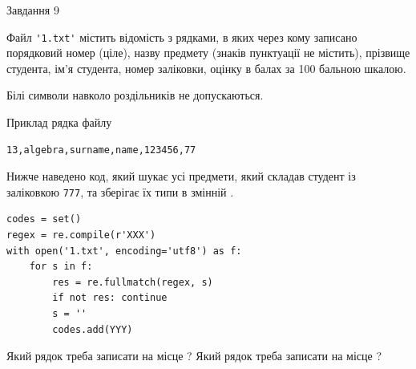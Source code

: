\documentclass[12pt, ukrainian]{article}
\def\code#1{\Verb!#1!}
\begin{document}
{\begin{minipage}[t]{8.0cm}
\end{minipage}

               
{\begin{center}Завдання {9}\end{center}}
\vspace{-4mm}
Файл \code{'1.txt'} містить відомість з рядками, в яких через кому записано поряд\-ковий номер (ціле), назву предмету (знаків пунктуації не містить), прізвище студента, ім'я студента, номер заліковки, оцінку в балах за 100 бальною шкалою.

Білі символи навколо роздільників не допускаються.

Приклад рядка файлу



\begin{verbatim}
13,algebra,surname,name,123456,77
\end{verbatim}


Нижче наведено код, який шукає усі предмети, який складав студент із заліковкою \code{777}, та зберігає їх типи в змінній .



\begin{verbatim}
codes = set()
regex = re.compile(r'XXX')
with open('1.txt', encoding='utf8') as f:
    for s in f:
        res = re.fullmatch(regex, s)
        if not res: continue
        s = ''
        codes.add(YYY)
\end{verbatim}



Який рядок треба записати на місце  ?
Який рядок треба записати на місце  ?\par

}
\end{document}
